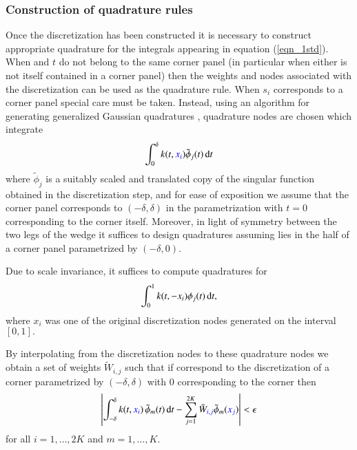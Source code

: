 \subsubsection{Construction of quadrature rules}

Once the discretization has been constructed it is necessary to construct appropriate quadrature for the integrals appearing in equation (\ref{eqn_1std}). When  and $t$ do not belong to the same corner panel (in particular when either is not itself contained in a corner panel) then the weights and nodes associated with the discretization can be used as the quadrature rule. When $s_i$ corresponds to a corner panel special care must be taken. Instead, using an algorithm for generating generalized Gaussian quadratures \cite{bremer2010}, quadrature nodes are chosen which integrate
\begin{align}
\int_{0}^\delta k(t,{\color{blue} x_i}) \tilde{\phi}_j(t)\,{\rm d}t
\end{align} 
where $\tilde{\phi}_j$ is a suitably scaled and translated copy of the singular function obtained in the discretization step, and for ease of exposition we assume that the corner panel corresponds to $(-\delta,\delta)$ in the parametrization with $t=0$ corresponding to the corner itself. Moreover, in light of symmetry between the two legs of the wedge it suffices to design quadratures assuming   lies in the half of a corner panel parametrized by $(-\delta,0).$
\begin{remark1}
Due to scale invariance, it suffices to compute quadratures for 
\begin{align}
\int_{0}^1 k(t,-x_i) {\phi}_j(t)\,{\rm d}t,
\end{align} 
where $x_i$ was one of the original discretization nodes generated on the interval $[0,1].$
\end{remark1}
\begin{remark1}
By interpolating from the discretization nodes to these quadrature nodes we obtain a set of weights $\tilde{W}_{i,j}$ such that if  correspond to the discretization of a corner parametrized by $(-\delta,\delta)$ with $0$ corresponding to the corner then
\begin{align}
\left| \int_{-\delta}^\delta k(t,{\color{blue} x_i}) \, \tilde{\phi}_m(t)\,{\rm d}t - \sum_{j=1}^{2K} \tilde{W}_{{\color{blue} i,j}} \tilde{\phi}_{m}({\color{blue} x_j}) \right| < \epsilon
\end{align}
for all $i=1,\dots,2K$ and $m=1,\dots,K.$
\end{remark1}

